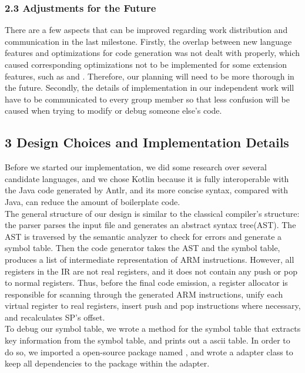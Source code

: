\documentclass[10pt,a4paper]{report}
\begin{document}
  \subsubsection*{2.3	Adjustments for the Future}
  There are a few aspects that can be improved regarding work distribution and communication
   in the last milestone. Firstly, the overlap between new language features and 
   optimizations for code generation was not dealt with properly, which caused corresponding 
   optimizations not to be implemented for some extension features, such as  and 
   . Therefore, our planning will need to be more thorough in the future. 
   Secondly, the details of implementation in our independent work will have to be communicated 
   to every group member so that less confusion will be caused when trying to modify or debug 
   someone else’s code.

  \subsection*{3 Design Choices and Implementation Details}
  Before we started our implementation, we did some research over several candidate languages, and we chose Kotlin because it is
  fully interoperable with the Java code generated by Antlr, and its more concise syntax, compared with Java, can reduce the amount 
  of boilerplate code.\\
  The general structure of our design is similar to the classical compiler's structure: the parser parses the input file and generates
  an abstract syntax tree(AST). The AST is traversed by the semantic analyzer to check for errors and generate a symbol table.
  Then the code generator takes the AST and the symbol table, produces a list of intermediate representation of ARM instructions.
  However, all registers in the IR are not real registers, and it does not contain any push or pop to normal registers. Thus, before the
  final code emission, a register allocator is responsible for scanning through the generated ARM instructions, unify each virtual 
  register to real registers, insert push and pop instructions where necessary, and recalculates SP's offset.\\
  To debug our symbol table, we wrote a  method for the symbol table that extracts key information from the symbol table, 
  and prints out a ascii table. In order to do so, we imported a open-source package named , and wrote a adapter class 
   to keep all dependencies to the package within the adapter.
\end{document}
